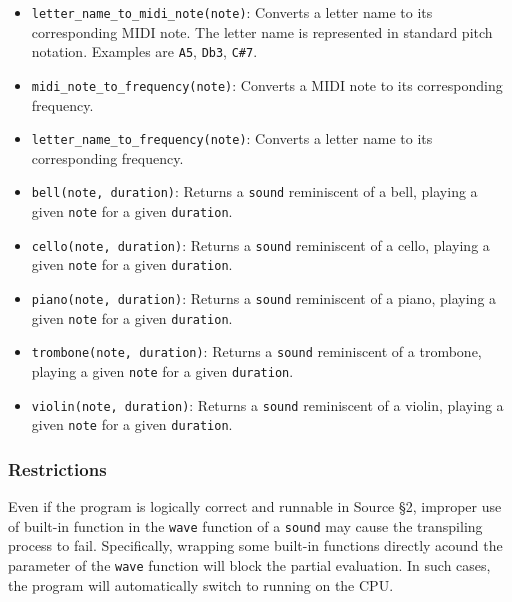 \begin{itemize}
\item \lstinline{letter_name_to_midi_note(note)}: Converts a letter name to its corresponding MIDI note. The letter name is represented in standard pitch notation. Examples are \lstinline{A5}, \lstinline{Db3}, \lstinline{C#7}.

\item \lstinline{midi_note_to_frequency(note)}: Converts a MIDI note to its corresponding frequency.

\item \lstinline{letter_name_to_frequency(note)}: Converts a letter name to its corresponding frequency.

\item \lstinline{bell(note, duration)}: Returns a \lstinline{sound} reminiscent of a bell, playing a given \lstinline{note} for a given \lstinline{duration}.

\item \lstinline{cello(note, duration)}: Returns a \lstinline{sound} reminiscent of a cello, playing a given \lstinline{note} for a given \lstinline{duration}.

\item \lstinline{piano(note, duration)}: Returns a \lstinline{sound} reminiscent of a piano, playing a given \lstinline{note} for a given \lstinline{duration}.

\item \lstinline{trombone(note, duration)}: Returns a \lstinline{sound} reminiscent of a trombone, playing a given \lstinline{note} for a given \lstinline{duration}.

\item \lstinline{violin(note, duration)}: Returns a \lstinline{sound} reminiscent of a violin, playing a given \lstinline{note} for a given \lstinline{duration}.

\end{itemize}

\subsubsection*{Restrictions}

Even if the program is logically correct and runnable in Source \S 2, improper use of built-in function in the \lstinline{wave} function of 
a \lstinline{sound} may cause the transpiling process to fail. Specifically, wrapping some built-in functions directly acound the parameter of the 
\lstinline{wave} function will block the partial evaluation. In such cases, the program will automatically switch to running on the CPU.


